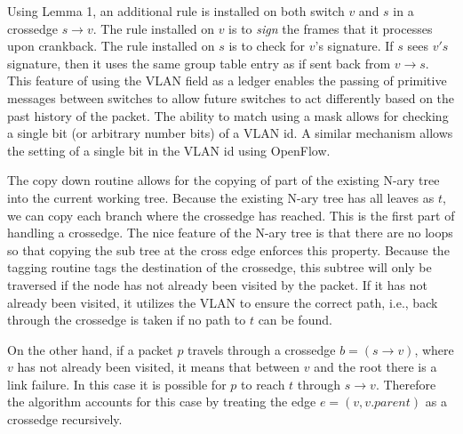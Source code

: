 \vspace{2mm}

Using Lemma 1, an additional rule is installed on both switch $v$ and $s$ in a crossedge $s\to v$.
The rule installed on $v$ is to \textit{sign} the frames that it processes upon crankback.
The rule installed on $s$ is to check for $v$'s signature.
If $s$ sees $v's$ signature, then it uses the same group table entry as if sent back from $v \to s$.
This feature of using the VLAN field as a ledger enables the passing of primitive messages between switches to allow future switches to act differently based on the past history of the packet.
The ability to match using a mask allows for checking a single bit (or arbitrary number bits) of a VLAN id.
A similar mechanism allows the setting of a single bit in the VLAN id using OpenFlow.


The copy down routine allows for the copying of part of the existing N-ary tree into the current working tree. Because the existing N-ary tree has all leaves as $t$, we can copy each branch where the crossedge has reached. This is the first part of handling a crossedge.
The nice feature of the N-ary tree is that there are no loops so that copying the sub tree at the cross edge enforces this property.
Because the tagging routine tags the destination of the crossedge, this subtree will only be traversed if the node has not already been visited by the packet.
If it has not already been visited, it utilizes the VLAN to ensure the correct path, i.e., back through the crossedge is taken if no path to $t$ can be found.


On the other hand, if a packet $p$ travels through a crossedge $b= (s \to v)$, where $v$ has not already been visited, it means that between $v$ and the root there is a link failure.
In this case it is possible for $p$ to reach $t$ through $s \to v$.
Therefore the algorithm accounts for this case by treating the edge $e= (v, v.parent)$ as a crossedge recursively.

